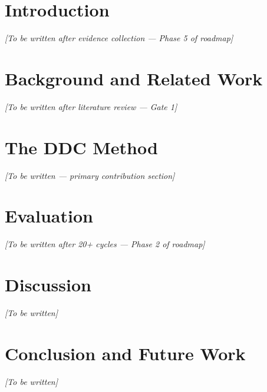 \documentclass[10pt,journal,compsoc]{IEEEtran}
\begin{document}
\section{Introduction}

\textit{[To be written after evidence collection --- Phase 5 of roadmap]}

\section{Background and Related Work}

\textit{[To be written after literature review --- Gate 1]}

\section{The DDC Method}

\textit{[To be written --- primary contribution section]}

\section{Evaluation}

\textit{[To be written after 20+ cycles --- Phase 2 of roadmap]}

\section{Discussion}

\textit{[To be written]}

\section{Conclusion and Future Work}

\textit{[To be written]}



\end{document}
